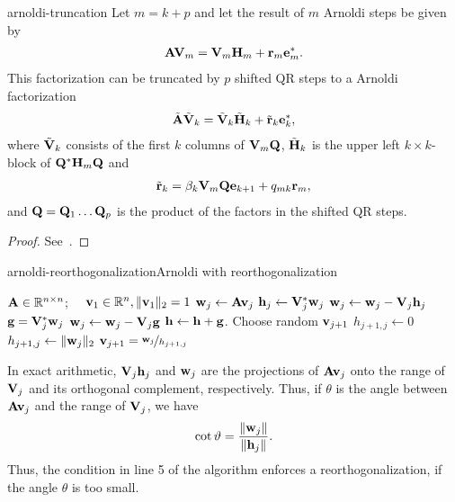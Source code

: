 \begin{Lemma}{arnoldi-truncation}
  Let $m=k+p$ and let the result of $m$ Arnoldi steps be given by
  \begin{gather}
    \mathbf A\mathbf V_m = \mathbf V_m\mathbf H_m + \mathbf r_m\mathbf e_m^*.
  \end{gather}
  This factorization can be truncated by $p$ shifted QR steps to a
  Arnoldi factorization
    \begin{gather}
    \tilde{\mathbf A}\tilde{\mathbf V}_k = \tilde{\mathbf V}_k\tilde{\mathbf H}_k + \tilde{\mathbf r}_k\mathbf e_k^*,
  \end{gather}
  where $\tilde{\mathbf V}_k$ consists of the first $k$ columns of $\mathbf V_m\mathbf Q$, $\tilde{\mathbf H}_k$ is the upper left $k\times k$-block of $\mathbf Q^*\mathbf H_m\mathbf Q$ and
  \begin{gather}
    \tilde{\mathbf r}_k = \beta_k\mathbf V_m\mathbf Q \mathbf e_{k+1} + q_{mk} \mathbf r_m ,
  \end{gather}
  and $\mathbf Q=\mathbf Q_1\dots\mathbf Q_p$ is the product of the factors in the
  shifted QR steps.
\end{Lemma}

\begin{proof}
  See~\cite[Section 4.5.1]{BaiDemmelDongarraRuhevanderVorst00}.
\end{proof}


\begin{Algorithm*}{arnoldi-reorthogonalization}{Arnoldi with reorthogonalization}
  \begin{algorithmic}[1]
    \Require $\mathbf A\in\mathbb R^{n\times n}$; $\quad\mathbf v_1\in\mathbb R^n, \lVert\mathbf v_1\rVert_2 = 1$
    \State $\mathbf w_j \gets \mathbf A\mathbf v_j$
    \State $\mathbf h_{j} \gets \mathbf V_j^*\mathbf w_j$
    \State $\mathbf w_j \gets \mathbf w_j - \mathbf V_j\mathbf h_{j}$
     
    \State $\mathbf g = \mathbf V_j^*\mathbf w_j$
    \State $\mathbf w_j \gets \mathbf w_j - \mathbf V_j\mathbf g$
    \State $\mathbf h \gets \mathbf h + \mathbf g$.
    \EndIf
    \State Choose random $\mathbf v_{j+1}$
    \State $h_{j+1,j} \gets 0$
    \Else
    \State $h_{j+1,j} \gets \lVert\mathbf w_j\rVert_2$
    \State $\mathbf v_{j+1} = \nicefrac{\mathbf w_j}{h_{j+1,j}}$
    \EndIf
    \EndFor
  \end{algorithmic}
\end{Algorithm*}

\begin{remark}
  In exact arithmetic, $\mathbf V_j\mathbf h_j$ and $\mathbf w_j$ are the projections
  of $\mathbf A\mathbf v_j$ onto the range of $\mathbf V_j$ and its orthogonal
  complement, respectively. Thus, if $\theta$ is the angle between
  $\mathbf A\mathbf v_j$ and the range of $\mathbf V_j$, we have
  \begin{gather}
    \cot\vartheta = \frac{\lVert\mathbf w_j\rVert}{\lVert\mathbf h_j\rVert}.
  \end{gather}
  Thus, the condition in line 5 of the algorithm enforces a
  reorthogonalization, if the angle $\theta$ is too small.
\end{remark}

